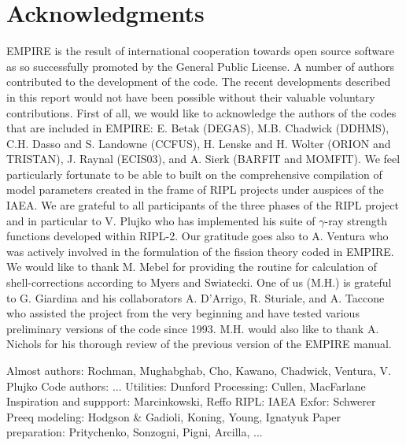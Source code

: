 \documentclass[twocolumn,amsmath,amssymb,10pt,groupedaddress,a4paper]{revtex4}
\begin{document}
\section*{Acknowledgments}
EMPIRE is the result of international cooperation towards open source software as so successfully promoted by the General Public License. A number of authors contributed to the development of the code. The recent developments described in this report would not have been possible without their valuable voluntary contributions. First of all, we would like to acknowledge the authors of the codes that are included in EMPIRE: E. Betak (DEGAS), M.B. Chadwick (DDHMS), C.H. Dasso and S. Landowne (CCFUS), H. Lenske and H. Wolter (ORION and TRISTAN), J. Raynal (ECIS03), and A. Sierk (BARFIT and MOMFIT). We feel particularly fortunate to be able to built on the comprehensive compilation of model parameters created in the frame of RIPL projects under auspices of the IAEA. We are grateful to all participants of the three phases of the RIPL project and in particular to V. Plujko who has implemented his suite of $\gamma$-ray strength functions developed within RIPL-2. Our gratitude goes also to A. Ventura who was actively involved in the formulation of the fission theory coded in EMPIRE. We would like to thank M. Mebel for providing the routine for calculation of shell-corrections according to Myers and Swiatecki. One of us (M.H.) is grateful to G. Giardina and his collaborators A. D'Arrigo, R. Sturiale, and A. Taccone who assisted the project from the very beginning and have tested various preliminary versions of the code since 1993. M.H. would also like to thank A. Nichols for his thorough review of the previous version of the EMPIRE manual.

Almost authors: Rochman, Mughabghab, Cho, Kawano, Chadwick, Ventura, V. Plujko
Code authors: ...
Utilities: Dunford
Processing: Cullen, MacFarlane
Inspiration and suppport: Marcinkowski, Reffo
RIPL: IAEA
Exfor: Schwerer
Preeq modeling: Hodgson \& Gadioli, Koning, Young, Ignatyuk
Paper preparation: Pritychenko, Sonzogni, Pigni, Arcilla, ...



\end{document}
